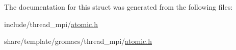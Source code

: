 \-The documentation for this struct was generated from the following files\-:\begin{DoxyCompactItemize}
\item 
include/thread\-\_\-mpi/\hyperlink{include_2thread__mpi_2atomic_8h}{atomic.\-h}\item 
share/template/gromacs/thread\-\_\-mpi/\hyperlink{share_2template_2gromacs_2thread__mpi_2atomic_8h}{atomic.\-h}\end{DoxyCompactItemize}
